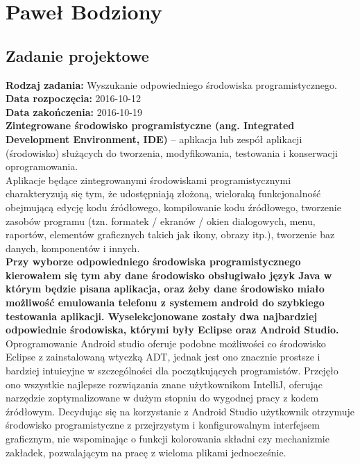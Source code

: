\chapter {Paweł Bodziony}
\section{Zadanie projektowe}
\noindent\textbf{Rodzaj zadania:} Wyszukanie odpowiedniego środowiska programistycznego. \\

\noindent\textbf{Data rozpoczęcia:} 2016-10-12\\

\noindent\textbf{Data zakończenia:} 2016-10-19\\


\textbf{Zintegrowane środowisko programistyczne (ang. Integrated Development Environment, IDE)} – aplikacja lub zespół aplikacji (środowisko) służących do tworzenia, modyfikowania, testowania i konserwacji oprogramowania.
\\

Aplikacje będące zintegrowanymi środowiskami programistycznymi charakteryzują się tym, że udostępniają złożoną, wieloraką funkcjonalność obejmującą edycję kodu źródłowego, kompilowanie kodu źródłowego, tworzenie zasobów programu (tzn. formatek / ekranów / okien dialogowych, menu, raportów, elementów graficznych takich jak ikony, obrazy itp.), tworzenie baz danych, komponentów i innych.
\\

\textbf{Przy wyborze odpowiedniego środowiska programistycznego kierowałem się tym aby dane środowisko obsługiwało język Java w którym będzie pisana aplikacja, oraz żeby dane środowisko miało możliwość emulowania telefonu z systemem android do szybkiego testowania aplikacji. Wyselekcjonowane zostały dwa  najbardziej odpowiednie środowiska, którymi były Eclipse oraz Android Studio.}
\\

Oprogramowanie Android studio oferuje podobne możliwości co środowisko Eclipse z zainstalowaną wtyczką ADT, jednak jest ono znacznie prostsze i bardziej intuicyjne w szczególności dla początkujących programistów. Przejęło ono wszystkie najlepsze rozwiązania znane użytkownikom IntelliJ, oferując narzędzie zoptymalizowane w dużym stopniu do wygodnej pracy z kodem źródłowym. Decydując się na korzystanie z Android Studio użytkownik otrzymuje środowisko programistyczne z przejrzystym i konfigurowalnym interfejsem graficznym, nie wspominając o funkcji kolorowania składni czy mechanizmie zakładek, pozwalającym na pracę z wieloma plikami jednocześnie.

